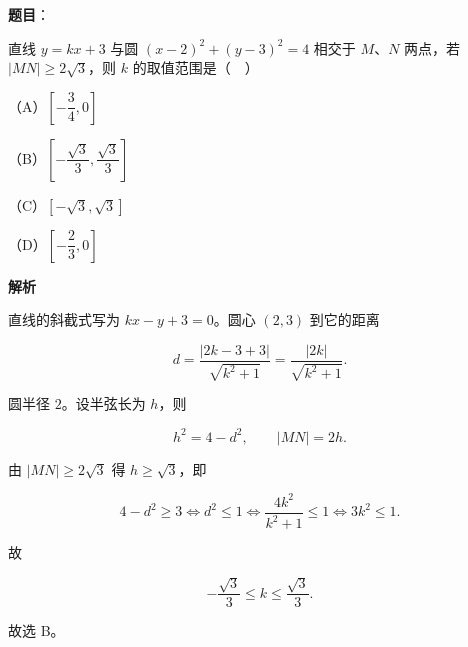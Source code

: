 \begin{answer}

\textbf{题目}：

直线 $y=kx+3$ 与圆 $(x-2)^2+(y-3)^2=4$ 相交于 $M$、$N$ 两点，若 $|MN|\geqslant2\sqrt3$，则 $k$ 的取值范围是（　）

（A）$\left[-\dfrac34,0\right]$

（B）$\left[-\dfrac{\sqrt3}3,\dfrac{\sqrt3}3\right]$

（C）$[-\sqrt3,\sqrt3]$

（D）$\left[-\dfrac23,0\right]$

\textbf{解析}

直线的斜截式写为 $kx-y+3=0$。圆心 $(2,3)$ 到它的距离

\nopagebreak[4]
\[d=\frac{|2k-3+3|}{\sqrt{k^2+1}}=\frac{|2k|}{\sqrt{k^2+1}}.\]

圆半径 $2$。设半弦长为 $h$，则

\nopagebreak[4]
\[h^2=4-d^2,\qquad |MN|=2h.\]

由 $|MN|\geqslant2\sqrt3$ 得 $h\geqslant\sqrt3$，即

\nopagebreak[4]
\[4-d^2\geqslant3\iff d^2\leqslant1
\iff \frac{4k^2}{k^2+1}\leqslant1
\iff 3k^2\leqslant1.\]

故

\nopagebreak[4]
\[-\frac{\sqrt3}3\leqslant k\leqslant\frac{\sqrt3}3.\]

故选 B。


\end{answer}
